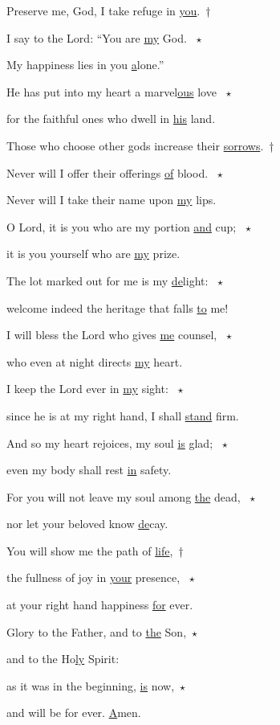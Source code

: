\noindent Preserve me, God, I take refuge in \uline{you}.~†~\nopagebreak

I say to the Lord: “You are \uline{my} God. ~$\star$~\nopagebreak

My happiness lies in you \uline{a}lone.”

\noindent He has put into my heart a marvel\uline{ous} love ~$\star$~\nopagebreak

for the faithful ones who dwell in \uline{his} land.

\noindent Those who choose other gods increase their \uline{sorrows}.~†~\nopagebreak

Never will I offer their offerings \uline{of} blood. ~$\star$~\nopagebreak

Never will I take their name upon \uline{my} lips.

\noindent O Lord, it is you who are my portion \uline{and} cup; ~$\star$~\nopagebreak

it is you yourself who are \uline{my} prize.

\noindent The lot marked out for me is my \uline{de}light: ~$\star$~\nopagebreak

welcome indeed the heritage that falls \uline{to} me!

\noindent I will bless the Lord who gives \uline{me} counsel, ~$\star$~\nopagebreak

who even at night directs \uline{my} heart.

\noindent I keep the Lord ever in \uline{my} sight: ~$\star$~\nopagebreak

since he is at my right hand, I shall \uline{stand} firm.

\noindent And so my heart rejoices, my soul \uline{is} glad; ~$\star$~\nopagebreak

even my body shall rest \uline{in} safety.

\noindent For you will not leave my soul among \uline{the} dead, ~$\star$~\nopagebreak

nor let your beloved know \uline{de}cay.

\noindent You will show me the path of \uline{life},~†~\nopagebreak

the fullness of joy in \uline{your} presence, ~$\star$~\nopagebreak

at your right hand happiness \uline{for} ever.

\noindent Glory to the Father, and to \uline{the} Son,~$\star$~\nopagebreak

and to the Ho\uline{ly} Spirit:

\noindent as it was in the beginning, \uline{is} now,~$\star$~\nopagebreak

and will be for ever. \uline{A}men.
